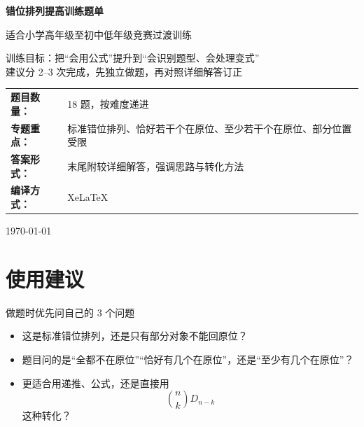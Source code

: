 \documentclass[11pt,a4paper,fontset=fandol]{ctexart}
\theoremstyle{formalexample}
\begin{document}
\thispagestyle{empty}
\begin{titlepage}
\centering
\vspace*{0.9cm}
\begin{tcolorbox}[
  enhanced,
  width=0.92\textwidth,
  colback=white,
  colframe=mainblue,
  boxrule=1pt,
  arc=0mm,
  left=6mm,
  right=6mm,
  top=8mm,
  bottom=8mm
]
\centering
{\fontsize{24}{30}\selectfont\bfseries 错位排列提高训练题单\par}
\vspace{0.6cm}
{\fontsize{17}{22}\selectfont 适合小学高年级至初中低年级竞赛过渡训练\par}

\vspace{1cm}
\begin{tcolorbox}[colback=lightblue,colframe=mainblue,width=0.84\textwidth,boxrule=1pt]
\centering
{\large 训练目标：把“会用公式”提升到“会识别题型、会处理变式”}\\[0.35em]
{\normalsize 建议分 2--3 次完成，先独立做题，再对照详细解答订正}
\end{tcolorbox}

\vspace{1cm}
\renewcommand{\arraystretch}{1.42}
\begin{tabular}{>{\bfseries}p{3.5cm}p{8cm}}
题目数量： & 18 题，按难度递进 \\
专题重点： & 标准错位排列、恰好若干个在原位、至少若干个在原位、部分位置受限 \\
答案形式： & 末尾附较详细解答，强调思路与转化方法 \\
编译方式： & XeLaTeX \\
\end{tabular}

\vspace{0.9cm}
{\large \today\par}
\end{tcolorbox}
\end{titlepage}

\tableofcontents
\newpage

\section{使用建议}

\begin{goalbox}{做题时优先问自己的 3 个问题}
\begin{itemize}
  \item 这是标准错位排列，还是只有部分对象不能回原位？
  \item 题目问的是“全都不在原位”“恰好有几个在原位”，还是“至少有几个在原位”？
  \item 更适合用递推、公式，还是直接用
  \[
  \binom{n}{k}D_{n-k}
  \]
  这种转化？
\end{itemize}
\end{goalbox}
\end{document}
